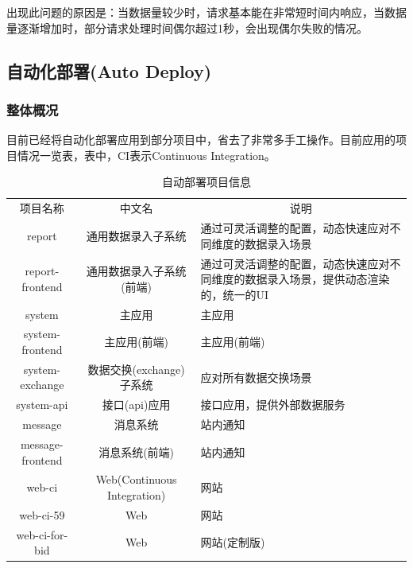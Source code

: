 \documentclass{book}
\begin{document}
出现此问题的原因是：当数据量较少时，请求基本能在非常短时间内响应，当数据量逐渐增加时，部分请求处理时间偶尔超过1秒，会出现偶尔失败的情况。

\subsection{自动化部署(Auto Deploy)}

\subsubsection{整体概况}

目前已经将自动化部署应用到部分项目中，省去了非常多手工操作。目前应用的项目情况一览表，表中，CI表示Continuous Integration。

\begin{table}[htbp]
	\caption{自动部署项目信息}
	\label{table:databaseconnectionpool}
	\begin{center}
		\begin{tabular}{|c|c|p{5cm}|}
			\hline
			\multirow{1}{*}{项目名称}
			& \multicolumn{1}{c|}{中文名} 
			& \multicolumn{1}{c|}{说明}\\			
			\cline{1-3}
			report &  通用数据录入子系统  & 通过可灵活调整的配置，动态快速应对不同维度的数据录入场景 \\
			\hline
			report-frontend & 通用数据录入子系统(前端) & 通过可灵活调整的配置，动态快速应对不同维度的数据录入场景，提供动态渲染的，统一的UI \\
			\hline
			system & 主应用 & 主应用 \\
			\hline
			system-frontend & 主应用(前端) & 主应用(前端) \\
			\hline
			system-exchange & 数据交换(exchange)子系统 & 应对所有数据交换场景 \\
			\hline
			system-api & 接口(api)应用 & 接口应用，提供外部数据服务 \\
			\hline
			message & 消息系统 & 站内通知 \\
			\hline
			message-frontend & 消息系统(前端) & 站内通知 \\
			\hline
			web-ci & Web(Continuous Integration) & 网站 \\
			\hline
			web-ci-59 & Web & 网站 \\
			\hline
			web-ci-for-bid & Web & 网站(定制版) \\
			\hline				
		\end{tabular}	
	\end{center}
\end{table}
\end{document}
